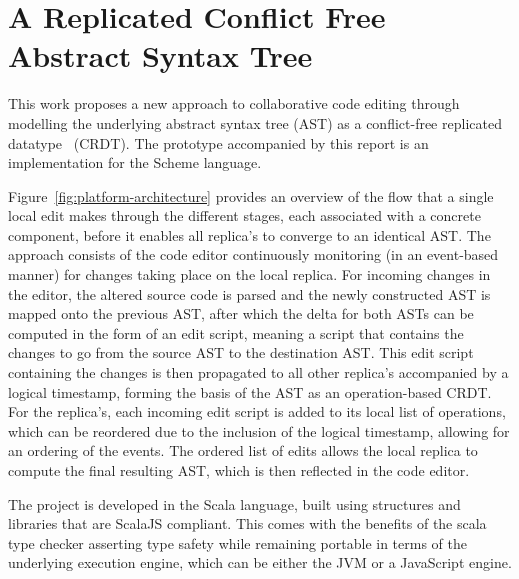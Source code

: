 \section{A Replicated Conflict Free Abstract Syntax Tree}\label{sec:replicated-conflict-free-abstract-syntax-tree}

This work proposes a new approach to collaborative code editing through modelling the underlying abstract syntax
tree (AST) as a conflict-free replicated datatype~\cite{10.1007/978-3-642-24550-3_29} (CRDT). %
The prototype accompanied by this report is an implementation for the Scheme language.

Figure~\ref{fig:platform-architecture} provides an overview of the flow that a single local edit makes through the
different stages, each associated with a concrete component, before it enables all replica's to converge to an identical
AST.
The approach consists of the code editor continuously monitoring (in an event-based manner) for changes taking place on
the local replica.
For incoming changes in the editor, the altered source code is parsed and the newly constructed AST is mapped onto the
previous AST, after which the delta for both ASTs can be computed in the form of an edit script, meaning a script that
contains the changes to go from the source AST to the destination AST.
This edit script containing the changes is then propagated to all other replica's accompanied by a logical timestamp,
forming the basis of the AST as an operation-based CRDT.
For the replica's, each incoming edit script is added to its local list of operations, which can be reordered due to the
inclusion of the logical timestamp, allowing for an ordering of the events.
The ordered list of edits allows the local replica to compute the final resulting AST, which is then reflected in
the code editor.

The project is developed in the Scala language, built using structures and libraries that are ScalaJS compliant.
This comes with the benefits of the scala type checker asserting type safety while remaining portable in terms of
the underlying execution engine, which can be either the JVM or a JavaScript engine.


